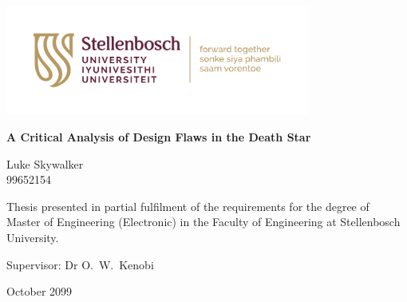 \graphicspath{{frontmatter/fig/}}

\begin{titlepage}
	\begin{center}
		
		\includegraphics[width=10cm]{SU_corporate_horizontal_with_slogan_RGB}
				
		\vfill
		
		{\sffamily \bfseries \huge A Critical Analysis of Design Flaws in the Death Star \par}
		
		\vfill
		
		{\large {\Large Luke Skywalker} \\ 99652154 \par}
		
		\vfill
		
		\vfill
		
		
		{\large Thesis presented in partial fulfilment of the requirements for the degree of \\ Master of Engineering (Electronic) in the Faculty of Engineering at Stellenbosch University. \par}
		
		
		
		\vfill
		
		{\large {Supervisor}: Dr O.\ W.\ Kenobi}
		
		\vfill
		
		{\Large October 2099}
	\end{center}
\end{titlepage}
